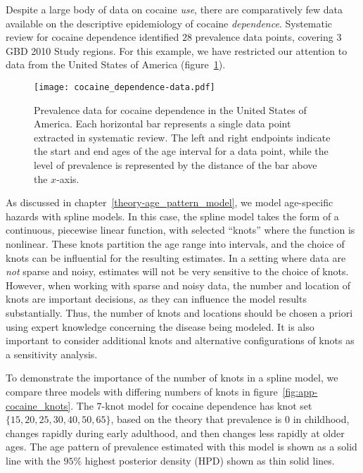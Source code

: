 Despite a large body of data on cocaine \emph{use}, there are comparatively few
data available on the descriptive epidemiology of cocaine
\emph{dependence}.\cite{degenhardt_what_2011} Systematic review for cocaine
dependence identified $28$ prevalence data points,
covering $3$ GBD 2010 Study regions.  For this example, we have restricted our attention
to data from the United States of America (figure~\ref{fig:app-cocaine_data}).

    \begin{figure}[h]
        \begin{center}
            \texttt{[image: cocaine\_dependence-data.pdf]}
            \caption[Systematic review data for cocaine dependence.]{Prevalence
              data for cocaine dependence in the
              United States of America. Each horizontal bar represents
              a single data point extracted in systematic review.  The
              left and right endpoints indicate the start and end ages
              of the age interval for a data point, while the level of
              prevalence is represented by the distance of the bar
              above the $x$-axis.}
            \label{fig:app-cocaine_data}
        \end{center}
    \end{figure}

As discussed in chapter~\ref{theory-age_pattern_model}, we model
age-specific hazards with spline models.  In this
case, the spline model takes the form of a continuous, piecewise
linear function, with selected ``knots'' where the function is nonlinear.
These knots partition the age range
into intervals, and the choice of knots can be influential for the
resulting estimates.  In a setting where data are \emph{not} sparse and
noisy, estimates will not be very sensitive to the choice of knots.
However, when working with sparse and noisy data, the number and
location of knots are important decisions, as they can influence the
model results substantially.  Thus, the number of knots and locations
should be chosen a priori using expert knowledge concerning the
disease being modeled.  It is also
important to consider additional knots and alternative configurations
of knots as a sensitivity analysis.

To demonstrate the importance of the number of knots in a spline
model, we compare three models with differing numbers of knots in
figure~\ref{fig:app-cocaine_knots}.  The $7$-knot model for cocaine
dependence has knot set $\{15, 20, 25, 30, 40, 50, 65\}$, based on the theory that prevalence is $0$ in childhood,
changes rapidly during early adulthood, and then changes less rapidly
at older ages.  The age pattern of prevalence estimated with this
model is shown as a solid line with the $95\%$ highest posterior
density (HPD) shown as thin solid lines.

